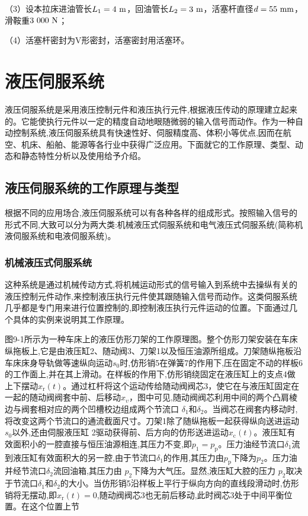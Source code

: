 （3）设本拉床进油管长$L_\text{1}=4\ \rm m$，回油管长$L_\text{2}=3\ \rm m$，活塞杆直径$d=55\ \rm mm$，滑鞍重$3\ 000\ \rm N$；

（4）活塞杆密封为V形密封，活塞密封用活塞环。

\chapter{液压伺服系统}

液压伺服系统是采用液压控制元件和液压执行元件,根据液压传动的原理建立起来的。它能使执行元件以一定的精度自动地眼随微弱的输入信号而动作。作为一种自动控制系统,液压伺服系统具有快速性好、伺服精度高、体积小等优点,因而在航空、机床、船舶、能源等各行业中获得广泛应用。下面就它的工作原理、类型、动态和静态特性分析以及使用给予介绍。

\section{液压伺服系统的工作原理与类型}
根据不同的应用场合,液压伺服系统可以有各种各样的组成形式。按照输入信号的形式不同,大致可以分为两大类:机械液压式伺服系统和电气液压式伺服系统(简称机液伺服系统和电液伺服系统)。

\subsection{机械液压式伺服系统}

这种系统是通过机械传动方式,将机械运动形式的信号输入到系统中去操纵有关的液压控制元件动作,来控制液压执行元件使其跟随输入信号而动作。这类伺服系统几乎都是专门用来进行位置控制的,即控制液压执行元件运动的位置。下面通过几个具体的实例来说明其工作原理。

图9-1所示为一种车床上的液压仿形刀架的工作原理图。整个仿形刀架安装在车床纵拖板上,它是由液压缸2、随动阀3、刀架1以及恒压油源所组成。刀架随纵拖板沿车床床身导轨做等速纵向运动$s_\text{0}$时,仿形销5在弹簧7的作用下,压在固定不动的样板6的工作面上,并在其上滑动。在样板的作用下,仿形销绕固定在液压缸上的支点4做上下摆动$x_\text{r}(t)$。通过杠杆将这个运动传给随动阀阀芯3，使它在与液压缸固定在一起的随动阀阀套中前、后移动$x_\upsilon$，图中可见,随动阀阀芯利用中间的两个凸肩棱边与阀套相对应的两个凹槽校边组成两个节流口 $\delta_\text{1}$和$\delta_\text{2}$。当阀芯在阀套内移动时,将改变这两个节流口的通流截面尺寸。刀架1除了随纵拖板一起获得纵向送进运动$s_\text{0}$以外,还由伺服液压缸 2驱动获得前、后方向的仿形送进运动$x_\text{c}(t)$。液压缸有效面积小的一腔直接与恒压油源相连,其压力不变,即$p_\text{1}=p_\text{p}$。压力油经节流口$\delta_\text{1}$流到液压缸有效面积大的另一腔,由于节流口$\delta_\text{1}$的作用,其压力由$p_\text{p}$下降为$p_\text{2}$。压力油并经节流口$\delta_\text{2}$流回油箱,其压力由 $p_\text{2}$下降为大气压。显然,液压缸大腔的压力 $p_\text{2}$取决于节流口$\delta_\text{1}$和$\delta_\text{2}$的大小。当仿形销5沿样板上平行于纵向方向的直线段滑动时,仿形销将无摆动,即$x_\text{r}(t)=0$,随动阀阀芯3也无前后移动,此时阀芯3处于中间平衡位置。在这个位置上节
